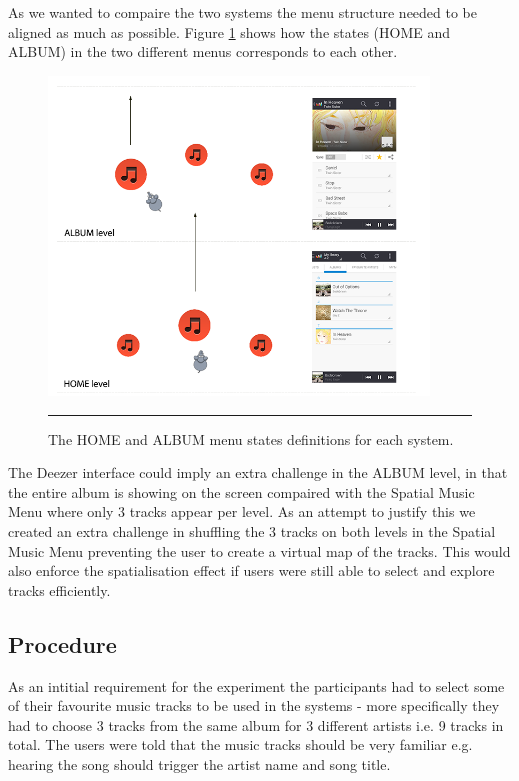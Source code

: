 As we wanted to compaire the two systems the menu structure needed to be aligned as much as possible. Figure \ref{fig:menustates} shows how the states (HOME and ALBUM) in the two different menus corresponds to each other.

\begin{figure}[t]
	\centering
		\includegraphics[width=0.9\textwidth,height=\textheight,keepaspectratio]{./Figures/menustates.png}
		\rule{35em}{1pt}
	\caption[Menu states comparison]{The HOME and ALBUM menu states definitions for each system.}
	\label{fig:menustates}
\end{figure}

The Deezer interface could imply an extra challenge in the ALBUM level, in that the entire album is showing on the screen compaired with the Spatial Music Menu where only 3 tracks appear per level. As an attempt to justify this we created an extra challenge in shuffling the 3 tracks on both levels in the Spatial Music Menu preventing the user to create a virtual map of the tracks. This would also enforce the spatialisation effect if users were still able to select and explore tracks efficiently.

\subsection{Procedure}
As an intitial requirement for the experiment the participants had to select some of their favourite music tracks to be used in the systems - more specifically they had to choose 3 tracks from the same album for 3 different artists i.e. 9 tracks in total. The users were told that the music tracks should be very familiar e.g. hearing the song should trigger the artist name and song title.

